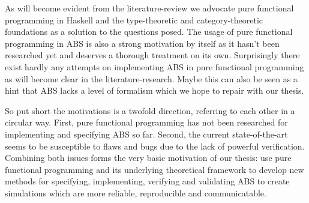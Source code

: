 As will become evident from the literature-review we advocate pure functional programming in Haskell and the type-theoretic and category-theoretic foundations as a solution to the questions posed. The usage of pure functional programming in ABS is also a strong motivation by itself as it hasn't been researched yet and deserves a thorough treatment on its own. Surprisingly there exist hardly any attempts on implementing ABS in pure functional programming as will become clear in the literature-research. Maybe this can also be seen as a hint that ABS lacks a level of formalism which we hope to repair with our thesis. 

So put short the motivations is a twofold direction, referring to each other in a circular way. First, pure functional programming has not been researched for implementing and specifying ABS so far. Second,  the current state-of-the-art seems to be susceptible to flaws and bugs due to the lack of powerful verification. Combining both issues forms the very basic motivation of our thesis: use pure functional programming and its underlying theoretical framework to develop new methods for specifying, implementing, verifying and validating ABS to create simulations which are more reliable, reproducible and communicatable.